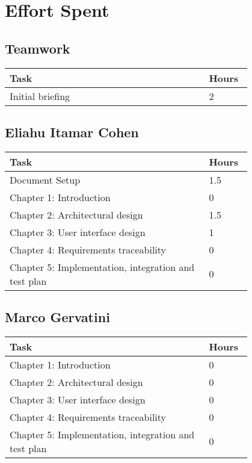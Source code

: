 \chapter{Effort Spent}
\section{Teamwork}
\begin{center}
    \begin{tabular}{@{}p{0.7\linewidth} p{0.1\linewidth}@{}}
        \hline
        \textbf{Task} & \textbf{Hours} \\ \hline
        Initial briefing & 2 \\ \hline
    \end{tabular}
\end{center}

\section{Eliahu Itamar Cohen}
\begin{center}
    \begin{tabular}{@{}p{0.7\linewidth} p{0.1\linewidth}@{}}
        \hline
        \textbf{Task} & \textbf{Hours} \\ \hline
        Document Setup & 1.5 \\ \hline
        Chapter 1: Introduction & 0 \\ \hline
        Chapter 2: Architectural design & 1.5 \\ \hline
        Chapter 3: User interface design & 1 \\ \hline
        Chapter 4: Requirements traceability & 0 \\ \hline
        Chapter 5: Implementation, integration and test plan & 0 \\ \hline
     
    \end{tabular}
\end{center}

\section{Marco Gervatini}
\begin{center}
	\begin{tabular}{@{}p{0.7\linewidth} p{0.1\linewidth}@{}}
		\hline
		\textbf{Task} & \textbf{Hours} \\ \hline
             Chapter 1: Introduction & 0 \\ \hline
             Chapter 2: Architectural design & 0 \\ \hline
             Chapter 3: User interface design & 0 \\ \hline
             Chapter 4: Requirements traceability & 0 \\ \hline
             Chapter 5: Implementation, integration and test plan & 0 \\ \hline
	\end{tabular}
\end{center}

